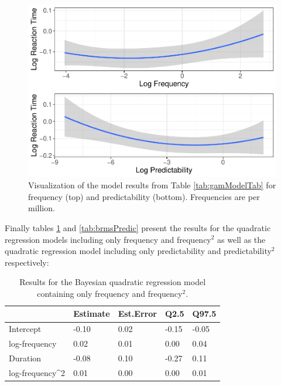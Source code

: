 \documentclass[
  man,floatsintext]{apa6}
\begin{document}
\begin{figure}

{\centering \includegraphics[width=0.8\linewidth]{write-up_files/figure-latex/FullQuadraticPlot-1} 

}

\caption{Visualization of the model results from Table \ref{tab:gamModelTab} for frequency (top) and predictability (bottom). Frequencies are per million.}\label{fig:FullQuadraticPlot}
\end{figure}

Finally tables \ref{tab:brmsFreq} and \ref{tab:brmsPredic} present the results for the quadratic regression models including only frequency and frequency\(^2\) as well as the quadratic regression model including only predictability and predictability\(^2\) respectively:



\begin{table}[H]

\begin{center}
\begin{threeparttable}

\caption{\label{tab:brmsFreq}Results for the Bayesian quadratic regression model containing only frequency and frequency\(^2\).}

\begin{tabular}{lllll}
\toprule
 & \multicolumn{1}{c}{Estimate} & \multicolumn{1}{c}{Est.Error} & \multicolumn{1}{c}{Q2.5} & \multicolumn{1}{c}{Q97.5}\\
\midrule
Intercept & -0.10 & 0.02 & -0.15 & -0.05\\
log-frequency & 0.02 & 0.01 & 0.00 & 0.04\\
Duration & -0.08 & 0.10 & -0.27 & 0.11\\
log-frequency\textasciicircum{}2 & 0.01 & 0.00 & 0.00 & 0.01\\
\bottomrule
\end{tabular}

\end{threeparttable}
\end{center}

\end{table}
\end{document}
